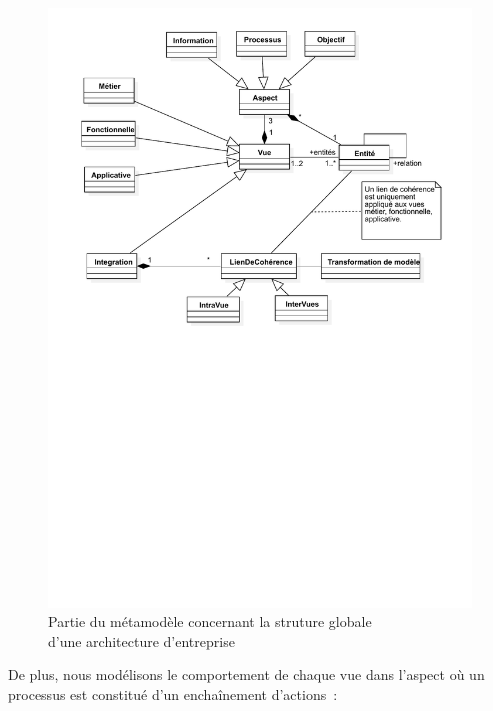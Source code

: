 \begin{figure}[!ht]
    \begin{center}
    \includegraphics[trim= 0cm 14cm 0cm 0cm, width=1\textwidth]{figures/4_demarche/ea3m.pdf}
    \end{center}
    \caption{Partie du métamodèle concernant la struture globale\\d'une architecture d'entreprise} \label{fig:ea3m}
\end{figure}


De plus, nous modélisons le comportement de chaque vue dans l'aspect
 où un processus est constitué d'un enchaînement d'actions~:

